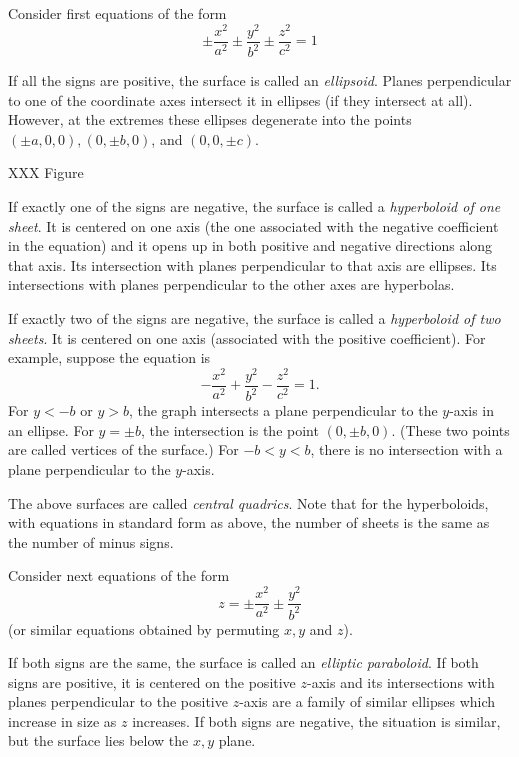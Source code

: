 Consider first equations of the form
\[
   \pm \frac{x^2}{a^2} 
   \pm \frac{y^2}{b^2} 
   \pm \frac{z^2}{c^2} = 1
\]

If all the signs are positive, the surface is called an {\it 
ellipsoid}.
Planes perpendicular to one of the coordinate axes intersect it
in ellipses (if they intersect at all).   However, at the extremes
these ellipses degenerate into the points $(\pm a, 0, 0),
(0,\pm b, 0)$, and $(0,0,\pm c)$.

XXX Figure

If exactly one of the signs are negative, the surface is called a
\emph{hyperboloid of one sheet}.   It is centered on one axis
(the one associated with the negative coefficient in the equation)
and it opens up in both positive and negative directions along
that axis.  Its intersection with planes perpendicular to that
axis are ellipses.   Its intersections with planes perpendicular to
the other axes are hyperbolas.


If exactly two of the signs are negative, the surface is called
a \emph{hyperboloid of two sheets}.   It is centered on one
axis (associated with the positive coefficient).  For example,
suppose the equation is
\[
  -\frac{x^2}{a^2}
  +\frac{y^2}{b^2}
  -\frac{z^2}{c^2} = 1.
\]
For $y < -b$ or $y > b$, the graph intersects a plane perpendicular
to the $y$-axis in an ellipse.  For $y = \pm b$, the intersection
is the point $(0,\pm b, 0)$.  (These two points are called vertices
of the surface.)  For $-b < y < b$, there is no intersection with
a plane perpendicular to the $y$-axis.


The above surfaces are called \emph{central quadrics}.
Note that for the hyperboloids, with equations in standard form as
above, the number of sheets is the same as
the number of minus signs.

Consider next equations of the form
\[
   z = \pm \frac{x^2}{a^2} \pm \frac{y^2}{b^2}
\]
(or similar equations obtained by permuting $x, y$ and $z$).

If both signs are the same, the surface is called an {\it elliptic
paraboloid}.   If both signs are positive, it is centered on the
positive $z$-axis and its intersections with planes perpendicular to
the positive $z$-axis are a family of similar ellipses which increase
in size as $z$ increases.   If both signs are negative, the situation
is similar, but the surface lies below the $x,y$ plane.


